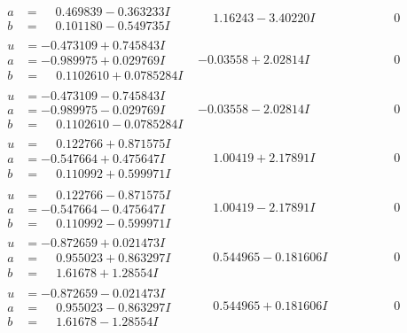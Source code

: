 \documentclass[1p]{elsarticle_modified}
\theoremstyle{definition}
\begin{document}
$$\begin{array}{c|c|c}
\begin{aligned}
a &= \phantom{-}0.469839 - 0.363233 I \\
b &= \phantom{-}0.101180 - 0.549735 I\end{aligned}
 & \phantom{-}1.16243 - 3.40220 I & \phantom{-0.000000 } 0 \\ \hline\begin{aligned}
u &= -0.473109 + 0.745843 I \\
a &= -0.989975 + 0.029769 I \\
b &= \phantom{-}0.1102610 + 0.0785284 I\end{aligned}
 & -0.03558 + 2.02814 I & \phantom{-0.000000 } 0 \\ \hline\begin{aligned}
u &= -0.473109 - 0.745843 I \\
a &= -0.989975 - 0.029769 I \\
b &= \phantom{-}0.1102610 - 0.0785284 I\end{aligned}
 & -0.03558 - 2.02814 I & \phantom{-0.000000 } 0 \\ \hline\begin{aligned}
u &= \phantom{-}0.122766 + 0.871575 I \\
a &= -0.547664 + 0.475647 I \\
b &= \phantom{-}0.110992 + 0.599971 I\end{aligned}
 & \phantom{-}1.00419 + 2.17891 I & \phantom{-0.000000 } 0 \\ \hline\begin{aligned}
u &= \phantom{-}0.122766 - 0.871575 I \\
a &= -0.547664 - 0.475647 I \\
b &= \phantom{-}0.110992 - 0.599971 I\end{aligned}
 & \phantom{-}1.00419 - 2.17891 I & \phantom{-0.000000 } 0 \\ \hline\begin{aligned}
u &= -0.872659 + 0.021473 I \\
a &= \phantom{-}0.955023 + 0.863297 I \\
b &= \phantom{-}1.61678 + 1.28554 I\end{aligned}
 & \phantom{-}0.544965 - 0.181606 I & \phantom{-0.000000 } 0 \\ \hline\begin{aligned}
u &= -0.872659 - 0.021473 I \\
a &= \phantom{-}0.955023 - 0.863297 I \\
b &= \phantom{-}1.61678 - 1.28554 I\end{aligned}
 & \phantom{-}0.544965 + 0.181606 I & \phantom{-0.000000 } 0 \\ \hline\begin{aligned}

\end{aligned}
\end{array}$$
\end{document}
